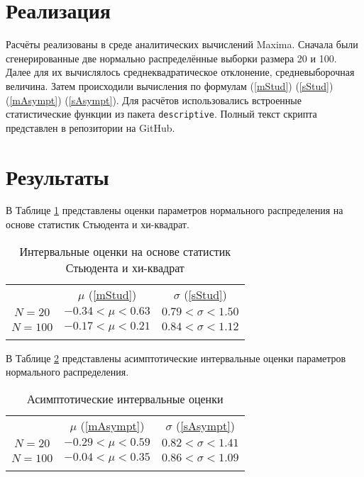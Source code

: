 \documentclass[12pt]{article}
\begin{document}
\begin{flushleft}
\section{Реализация}

	Расчёты реализованы в среде аналитических вычислений Maxima. Сначала были сгенерированные две нормально распределённые выборки размера 20 и 100. Далее для их вычислялось среднеквадратическое отклонение, средневыборочная величина. Затем происходили вычисления по формулам (\ref{mStud}) (\ref{sStud}) (\ref{mAsympt}) (\ref{sAsympt}). Для расчётов использовались встроенные статистические функции из пакета \texttt{descriptive}. Полный текст скрипта представлен в репозитории на GitHub.

\newpage

\section{Результаты}

	В Таблице \ref{interv_chi} представлены оценки параметров нормального распределения на основе статистик Стьюдента и хи-квадрат.

		\begin{table}[h]
			\begin{center}
				\caption{Интервальные оценки на основе статистик Стьюдента и хи-квадрат}
				\begin{tabular}{||c||c|c||} \hhline{~|t:=:=:t|}
					\multicolumn{1}{c||}{} & $\mu$ (\ref{mStud}) & $\sigma$ (\ref{sStud})\\
					\hhline{|t:=::=:=:|}
					$N = 20$ & $-0.34 < \mu < 0.63$ & $0.79 < \sigma < 1.50$\\
					\hhline{||-||-|-||}
					$N = 100$ & $-0.17 < \mu < 0.21$ & $0.84 < \sigma < 1.12$\\
					\hhline{|b:=:=:=:b|}
				\end{tabular}
			\label{interv_chi}
			\end{center}
		\end{table}

		В Таблице \ref{interv_asumpt} представлены асимптотические интервальные оценки параметров нормального распределения.

		\begin{table}[h]
			\begin{center}
				\caption{Асимптотические интервальные оценки}
				\begin{tabular}{||c||c|c||} \hhline{~|t:=:=:t|}
					\multicolumn{1}{c||}{} & $\mu$ (\ref{mAsympt}) & $\sigma$ (\ref{sAsympt})\\
					\hhline{|t:=::=:=:|}
					$N = 20$ & $-0.29 < \mu < 0.59$ & $0.82 < \sigma < 1.41$\\
					\hhline{||-||-|-||}
					$N = 100$ & $-0.04 < \mu < 0.35$ & $0.86 < \sigma < 1.09$\\
					\hhline{|b:=:=:=:b|}
				\end{tabular}
			\label{interv_asumpt}
			\end{center}
		\end{table}


\end{flushleft}
\end{document}
